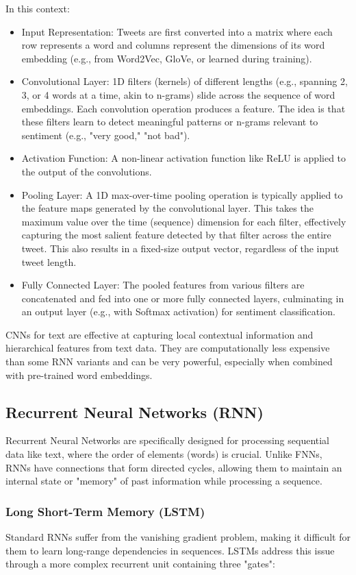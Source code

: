 In this context:

\begin{itemize}
    \item Input Representation: Tweets are first converted into a matrix where each row represents a word and columns represent the dimensions of its word embedding (e.g., from Word2Vec, GloVe, or learned during training).
    \item Convolutional Layer: 1D filters (kernels) of different lengths (e.g., spanning 2, 3, or 4 words at a time, akin to n-grams) slide across the sequence of word embeddings. Each convolution operation produces a feature. The idea is that these filters learn to detect meaningful patterns or n-grams relevant to sentiment (e.g., "very good," "not bad").
    \item Activation Function: A non-linear activation function like ReLU is applied to the output of the convolutions.
    \item Pooling Layer: A 1D max-over-time pooling operation is typically applied to the feature maps generated by the convolutional layer. This takes the maximum value over the time (sequence) dimension for each filter, effectively capturing the most salient feature detected by that filter across the entire tweet. This also results in a fixed-size output vector, regardless of the input tweet length.
    \item Fully Connected Layer: The pooled features from various filters are concatenated and fed into one or more fully connected layers, culminating in an output layer (e.g., with Softmax activation) for sentiment classification.
\end{itemize}
CNNs for text are effective at capturing local contextual information and hierarchical features from text data. They are computationally less expensive than some RNN variants and can be very powerful, especially when combined with pre-trained word embeddings.


\subsection{Recurrent Neural Networks (RNN)}
Recurrent Neural Networks are specifically designed for processing sequential data like text, where the order of elements (words) is crucial. Unlike FNNs, RNNs have connections that form directed cycles, allowing them to maintain an internal state or "memory" of past information while processing a sequence.

\subsubsection{Long Short-Term Memory (LSTM)}
Standard RNNs suffer from the vanishing gradient problem, making it difficult for them to learn long-range dependencies in sequences. LSTMs address this issue through a more complex recurrent unit containing three "gates":

